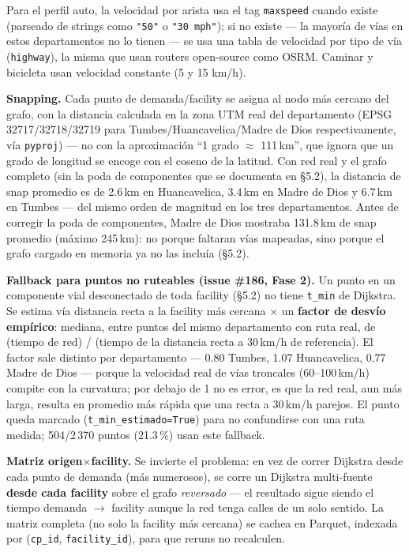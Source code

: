 \documentclass[11pt]{article}
\begin{document}
Para el perfil auto, la velocidad por arista usa el tag \texttt{maxspeed}
cuando existe (parseado de strings como \texttt{"50"} o \texttt{"30 mph"});
si no existe --- la mayoría de vías en estos departamentos no lo tienen ---
se usa una tabla de velocidad por tipo de vía (\texttt{highway}), la misma
que usan routers open-source como OSRM. Caminar y bicicleta usan velocidad
constante (5 y 15 km/h).

\textbf{Snapping.} Cada punto de demanda/facility se asigna al nodo más
cercano del grafo, con la distancia calculada en la zona UTM real del
departamento (EPSG 32717/32718/32719 para Tumbes/Huancavelica/Madre de
Dios respectivamente, vía \texttt{pyproj}) --- no con la aproximación
``1 grado $\approx$ 111\,km'', que ignora que un grado de longitud se
encoge con el coseno de la latitud. Con red real y el grafo completo (sin
la poda de componentes que se documenta en \S5.2), la distancia de snap
promedio es de 2.6\,km en Huancavelica, 3.4\,km en Madre de Dios y
6.7\,km en Tumbes --- del mismo orden de magnitud en los tres
departamentos. Antes de corregir la poda de componentes, Madre de Dios
mostraba 131.8\,km de snap promedio (máximo 245\,km): no porque faltaran
vías mapeadas, sino porque el grafo cargado en memoria ya no las incluía
(\S5.2).

\textbf{Fallback para puntos no ruteables (issue \#186, Fase 2).} Un punto
en un componente vial desconectado de toda facility (\S5.2) no tiene
\texttt{t\_min} de Dijkstra. Se estima vía distancia recta a la facility
más cercana $\times$ un \textbf{factor de desvío empírico}: mediana, entre
puntos del mismo departamento con ruta real, de (tiempo de red) / (tiempo
de la distancia recta a 30\,km/h de referencia). El factor sale distinto
por departamento --- 0.80 Tumbes, 1.07 Huancavelica, 0.77 Madre de Dios
--- porque la velocidad real de vías troncales (60--100\,km/h) compite con
la curvatura; por debajo de 1 no es error, es que la red real, aun más
larga, resulta en promedio más rápida que una recta a 30\,km/h parejos.
El punto queda marcado (\texttt{t\_min\_estimado=True}) para no
confundirse con una ruta medida; 504/2\,370 puntos (21.3\,\%) usan este
fallback.

\textbf{Matriz origen$\times$facility.} Se invierte el problema: en vez de
correr Dijkstra desde cada punto de demanda (más numerosos), se corre un
Dijkstra multi-fuente \textbf{desde cada facility} sobre el grafo
\emph{reversado} --- el resultado sigue siendo el tiempo demanda
$\to$ facility aunque la red tenga calles de un solo sentido. La matriz
completa (no solo la facility más cercana) se cachea en Parquet, indexada
por (\texttt{cp\_id}, \texttt{facility\_id}), para que reruns no recalculen.
\end{document}
